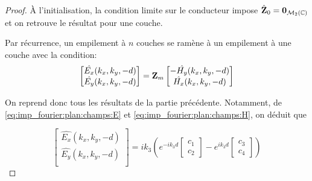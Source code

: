         \begin{proof}
            À l'initialisation, la condition limite sur le conducteur impose $\hat {\mathbf{Z}}_0 = \mathbf{0}_{\mathcal{M}_2(\mathbb C)}$ et on retrouve le résultat pour une couche.

            Par récurrence, un empilement à $n$ couches se ramène à un empilement à une couche avec la condition:
            \begin{equation}
                \begin{bmatrix}
                    \hat{E_x}(k_x,k_y,-d)\\
                    \hat{E_y}(k_x,k_y,-d)\\
                \end{bmatrix}
                =
                \mathbf{Z}_m
                \begin{bmatrix}
                    -\hat{H_y}(k_x,k_y,-d)\\
                    \hat{H_x}(k_x,k_y,-d)\\
                \end{bmatrix}
            \end{equation}

            On reprend donc tous les résultats de la partie précédente. Notamment, de \eqref{eq:imp_fourier:plan:champs:E} et \eqref{eq:imp_fourier:plan:champs:H}, on déduit que

            \begin{equation}
                \begin{bmatrix}
                    \hat{E_x}(k_x,k_y,-d)\\
                    \hat{E_y}(k_x,k_y,-d)\\
                \end{bmatrix}
                = ik_3\left( e^{-ik_3 d}
                \begin{bmatrix}
                    c_1 \\
                    c_2
                \end{bmatrix}
                -e^{ik_3 d}
                \begin{bmatrix}
                    c_3 \\
                    c_4
                \end{bmatrix}
                \right)
            \end{equation}


\end{proof}
